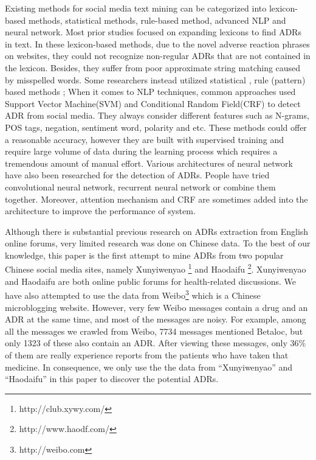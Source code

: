 Existing methods for social media text mining can be categorized into lexicon-based methods, statistical methods, rule-based method, advanced NLP and neural network. Most prior studies \citep{leaman2010towards,yang2012detecting,benton2011identifying,wu2013exploiting,yates2013ADRTrace,liu2014identifying,jiang2013discovering,freifeld2014digital,yeleswarapu2014pipeline} focused on expanding lexicons to find ADRs in text. In these lexicon-based methods, due to the novel adverse reaction phrases on websites, they could not recognize non-regular ADRs that are not contained in the lexicon. Besides, they suffer from poor approximate string matching caused by misspelled words. Some researchers instead utilized statistical \citep{li2011medical,wu2012early,liu2013azdrugminer}, rule (pattern) based methods \citep{nikfarjam2011pattern,benton2011identifying,karimi2011drug,yang2012detecting}; When it comes to NLP techniques, common approaches used Support Vector Machine(SVM) and Conditional Random Field(CRF) to detect ADR from social media\citep{sharif2014detecting,sarker2015portable,jonnagaddala2016binary,nikfarjam2015pharmacovigilance}. They always consider different features such as N-grams, POS tags, negation, sentiment word, polarity and etc. These methods could offer a reasonable accuracy, however they are built with supervised training and require large volume of data during the learning process which requires a tremendous amount of manual effort. Various architectures of neural network have also been researched for the detection of ADRs. People have tried convolutional neural network\citep{lee2017adverse}, recurrent neural network\citep{cocos2017deep} or combine them together\citep{huynh2016adverse}. Moreover, attention mechanism and CRF are sometimes added into the architecture to improve the performance of system\citep{pandey2017improving}. 

Although there is substantial previous research on ADRs extraction from English online forums, very limited research was done on Chinese data. To the best of our knowledge, this paper is the first attempt to mine ADRs from two popular Chinese social media sites, namely Xunyiwenyao \footnote{http://club.xywy.com/} and 
Haodaifu \footnote{http://www.haodf.com/}. Xunyiwenyao and Haodaifu are both online public forums for health-related discussions. 
We have also attempted to use the data from Weibo\footnote{http://weibo.com} which is a Chinese microblogging website. However, very few Weibo messages contain a drug and an ADR at the same time, and most of the messages are noisy. 
For example, among all the messages we crawled from Weibo, 7734 messages 
mentioned Betaloc, but only 1323 of these also contain an ADR. 
After viewing these messages, only 36\% of them are really experience reports 
from the patients who have taken that medicine.
In consequence, we only use the the data from ``Xunyiwenyao'' and ``Haodaifu'' 
in this paper to discover the potential ADRs.

